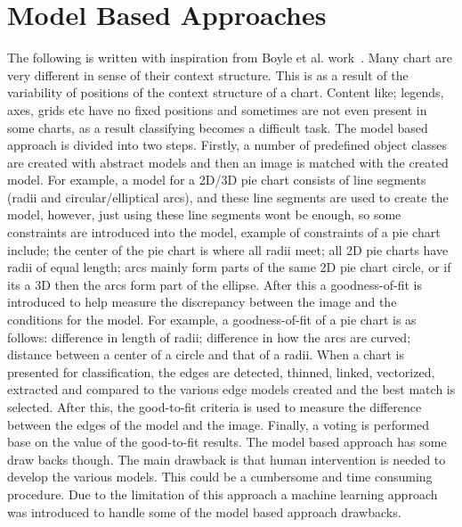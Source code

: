 \documentclass[12pt, a4paper,oneside]{report}
\begin{document}
\section{Model Based Approaches}
The following is written with inspiration from Boyle et al. work~\cite{boyle2007advances}. Many chart are very different in sense of their context structure. This is as a result of the variability of positions of the context structure of a chart. Content like; legends, axes, grids etc have no fixed positions and sometimes are not even present in some charts, as a result classifying becomes a difficult task. The model based approach is divided into two steps. Firstly, a number of predefined object classes are created with abstract models and then an image is matched with the created model. For example, a model for a 2D/3D pie chart consists of line segments (radii and circular/elliptical arcs), and these line segments are used to create the model, however, just using these line segments wont be enough, so some constraints are introduced into the model, example of constraints of a pie chart include; the center of the pie chart is where all radii meet; all 2D pie charts have radii of equal length; arcs mainly form parts of the same 2D pie chart circle, or if its a 3D then the arcs form part of the ellipse. After this a goodness-of-fit is introduced to help measure the discrepancy between the image and the conditions for the model. For example, a goodness-of-fit of a pie chart is as follows: difference in length of radii; difference in how the arcs are curved; distance between a center of a circle and that of a radii. When a chart is presented for classification, the edges are detected, thinned, linked, vectorized, extracted and compared to the various edge models created and the best match is selected. After this, the good-to-fit criteria is used to measure the difference between the edges of the model and the image. Finally, a voting is performed base on the value of the good-to-fit results. The model based approach has some draw backs though. The main drawback is that human intervention is needed to develop the various models. This could be a cumbersome and time consuming procedure. Due to the limitation of this approach a machine learning approach was introduced to handle some of the model based approach drawbacks.
\end{document}
